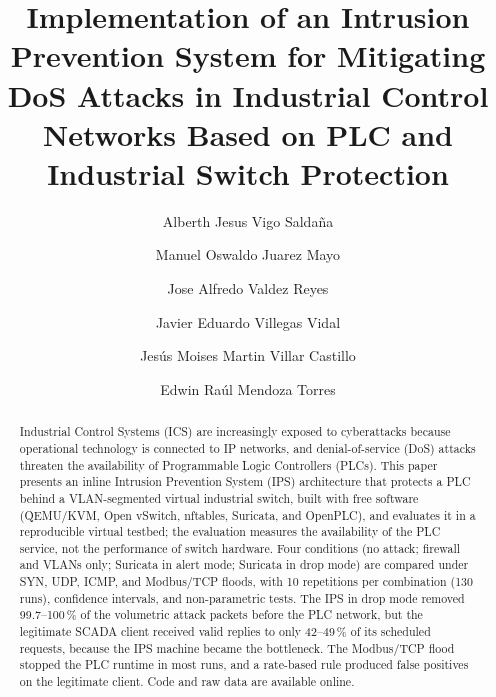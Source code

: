 \documentclass[sigconf]{acmart}
\begin{document}
\renewcommand{\abstractname}{Abstract}

\title[IPS for DoS Mitigation in ICS]{Implementation of an Intrusion Prevention System for Mitigating DoS Attacks in Industrial Control Networks Based on PLC and Industrial Switch Protection}

\author[ ]{Alberth Jesus Vigo Saldaña}

\author[ ]{Manuel Oswaldo Juarez Mayo}

\author[ ]{Jose Alfredo Valdez Reyes}

\author[ ]{Javier Eduardo Villegas Vidal}

\author[ ]{Jesús Moises Martin Villar Castillo}

\author[ ]{Edwin Ra\'ul Mendoza Torres}

\begin{abstract}
Industrial Control Systems (ICS) are increasingly exposed to cyberattacks because operational technology is connected to IP networks, and denial-of-service (DoS) attacks threaten the availability of Programmable Logic Controllers (PLCs).
This paper presents an inline Intrusion Prevention System (IPS) architecture that protects a PLC behind a VLAN-segmented virtual industrial switch, built with free software (QEMU/KVM, Open vSwitch, nftables, Suricata, and OpenPLC), and evaluates it in a reproducible virtual testbed; the evaluation measures the availability of the PLC service, not the performance of switch hardware.
Four conditions (no attack; firewall and VLANs only; Suricata in alert mode; Suricata in drop mode) are compared under SYN, UDP, ICMP, and Modbus/TCP floods, with 10 repetitions per combination (130 runs), confidence intervals, and non-parametric tests.
The IPS in drop mode removed 99.7--100\,\% of the volumetric attack packets before the PLC network, but the legitimate SCADA client received valid replies to only 42--49\,\% of its scheduled requests, because the IPS machine became the bottleneck.
The Modbus/TCP flood stopped the PLC runtime in most runs, and a rate-based rule produced false positives on the legitimate client.
Code and raw data are available online.
\end{abstract}

\maketitle










\end{document}
